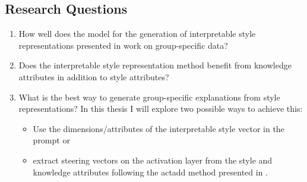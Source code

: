 \subsection{Research Questions}
\begin{enumerate}
	\item How well does the model for the generation of interpretable style representations presented in \citet{patelLearningInterpretableStyle2023} work on group-specific data?
	\item Does the interpretable style representation method benefit from knowledge attributes in addition to style attributes?
	\item What is the best way to generate group-specific explanations from style representations? \newline
	      In this thesis I will explore two possible ways to achieve this:
	      \begin{itemize}
		      \item Use the dimensions/attributes of the interpretable style vector in the prompt or
		      \item extract steering vectors on the activation layer from the style and knowledge attributes following the \ac{actadd} method presented in \citet{turnerActivationAdditionSteering2024}.
	      \end{itemize}
\end{enumerate}
